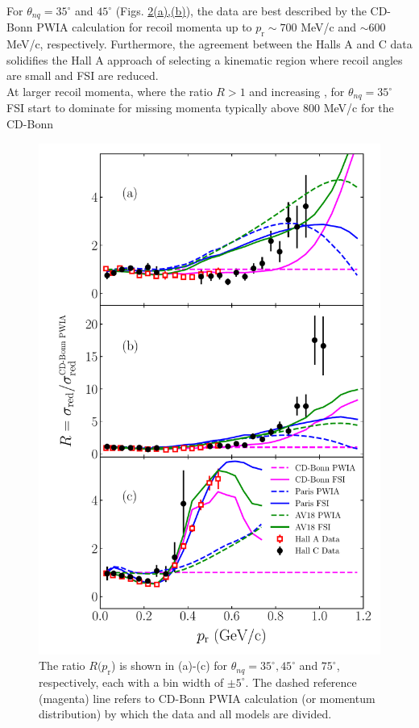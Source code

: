 \indent For $\theta_{nq}=35^{\circ}$ and $45^{\circ}$ (Figs. \hyperref[fig:fig2]{2(a),(b)}), the data are best described by the CD-Bonn PWIA calculation for recoil momenta up
to $p_{\mathrm{r}}\sim700$ MeV/c and $\sim600$ MeV/c, respectively. Furthermore, the agreement between the Halls A and C data solidifies the Hall A approach of selecting a kinematic
region where recoil angles are small and FSI are reduced. \\
\indent At larger recoil momenta, where the ratio \DIFdelbegin {}\DIFdelend $R>1$ and increasing \DIFaddbegin {}\DIFaddend , for $\theta_{nq}=35^{\circ}$ FSI start to dominate for
missing momenta typically above 800 MeV/c for the CD-Bonn
\DIFdelbegin %
\DIFdelendFL \DIFaddbeginFL \begin{figure}[!t]
\DIFaddendFL \includegraphics[scale=0.5]{./prl_plots/PRL_plot2.pdf}
\caption{The ratio $R(p_{\mathrm{r}}$) is shown in (a)-(c) for $\theta_{nq}=35^{\circ}, 45^{\circ}$ and $75^{\circ}$, respectively, each with a bin width of $\pm 5^{\circ}$.
The dashed reference (magenta) line refers to CD-Bonn PWIA calculation (or momentum distribution) by which the data and all models are divided.}
\label{fig:fig2}
\end{figure}
